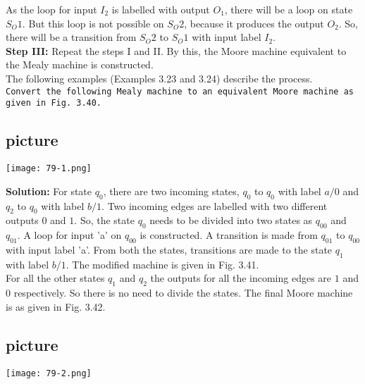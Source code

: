 \documentclass[9pt]{beamer}
\begin{document}
\begin{frame}
As the loop for input $I_2$
is labelled with output $O_1$, there will be a loop on state $S_O1$. But this loop is not possible on $S_O2$, because
it produces the output $O_2$. So, there will be a transition from $S_O2$ to $S_O1$ with input label $I_2$.\\

\vspace*{0.3cm}
\textbf{Step III:} Repeat the steps I and II. By this, the Moore machine equivalent to the Mealy machine is
constructed.\\
 \hspace*{0.3cm} The following examples (Examples 3.23 and 3.24) describe the process.\\
 
 \hspace*{0.1cm} \texttt{Convert the following Mealy machine
to an equivalent Moore machine as given in Fig. 3.40.}\\

\pause
\begin{center}
\section{picture}
\texttt{[image: 79-1.png]}
\end{center}
\end{frame}

\begin{frame}
\textbf{Solution:} For state $q_0$, there are two incoming states, $q_0$ to
$q_0$ with label $a/0$ and $q_2$ to $q_0$ with label $b/1$. Two incoming
edges are labelled with two different outputs $0$ and $1$. So,
the state $q_0$ needs to be divided into two states as $q_00$ and
$q_01$. A loop for input 'a' on $q_00$ is constructed. A transition
is made from $q_01$ to $q_00$ with input label 'a'. From both the
states, transitions are made to the state $q_1$ with label $b/1$.
The modified machine is given in Fig. 3.41.\\
\hspace*{0.3cm} For all the other states $q_1$ and $q_2$ the outputs for all the incoming edges are $1$ and $0$ respectively. So
there is no need to divide the states. The final Moore machine is as given in Fig. 3.42.
\pause
\begin{center}
\section{picture}
\texttt{[image: 79-2.png]}
\end{center}
\end{frame}
\end{document}
